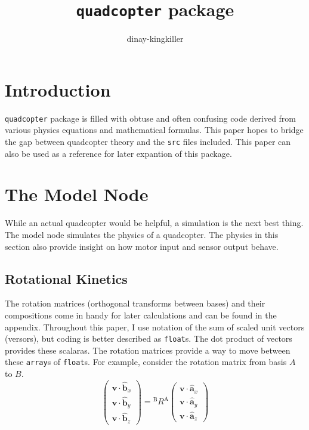 \documentclass[lettersize,journal]{IEEEtran}
\begin{document}
\title{\texttt{quadcopter} package}
\author{dinay-kingkiller}

\maketitle


\section{Introduction}
 \texttt{quadcopter} package is filled with obtuse and often confusing code derived from various physics equations and mathematical formulas. This paper hopes to bridge the gap between quadcopter theory and the \texttt{src} files included. This paper can also be used as a reference for later expantion of this package.

\section{The Model Node}
While an actual quadcopter would be helpful, a simulation is the next best thing. The model node simulates the physics of a quadcopter. The physics in this section also provide insight on how motor input and sensor output behave.

\subsection{Rotational Kinetics}
The rotation matrices (orthogonal transforms between bases) and their compositions come in handy for later calculations and can be found in the appendix. Throughout this paper, I use notation of the sum of scaled unit vectors (versors), but coding is better described as \texttt{float}s. The dot product of vectors provides these scalaras. The rotation matrices provide a way to move between these \texttt{array}s of \texttt{float}s. For example, consider the rotation matrix from basis $A$ to $B$.
\begin{equation}
  \begin{pmatrix}
    \mathbf{v} \cdot \mathbf{\hat{b}}_x \\
    \mathbf{v} \cdot \mathbf{\hat{b}}_y \\
    \mathbf{v} \cdot \mathbf{\hat{b}}_z
  \end{pmatrix}
  =
  {^\mathrm{B}R^\mathrm{A}}
  \begin{pmatrix}
    \mathbf{v} \cdot \mathbf{\hat{a}}_x \\
    \mathbf{v} \cdot \mathbf{\hat{a}}_y \\
    \mathbf{v} \cdot \mathbf{\hat{a}}_z
  \end{pmatrix}
\end{equation}
\end{document}
